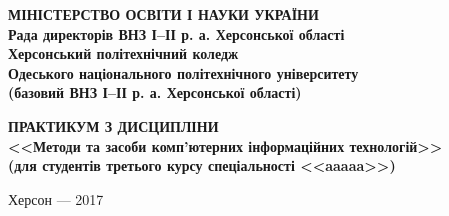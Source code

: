 \begin{titlepage}
\newpage

\begin{center}
\bf
МІНІСТЕРСТВО ОСВІТИ І НАУКИ УКРАЇНИ \\
Рада директорів ВНЗ І–ІІ р. а. Херсонської області\\
Херсонський політехнічний коледж\\
Одеського національного політехнічного університету\\
(базовий ВНЗ І–ІІ р. а. Херсонської області)

\end{center}


\vspace{8em}

\begin{center}
\Large\bf ПРАКТИКУМ З ДИСЦИПЛІНИ\\
<<Методи та засоби комп'ютерних інформаційних технологій>>\\
(для студентів третього курсу спеціальності <<aaaaa>>)
\end{center}


\vspace{\fill}

\begin{center}
Херсон --- 2017
\end{center}

\end{titlepage}






\tableofcontents


\listoffigures

\listoftables

\lstlistoflistings



